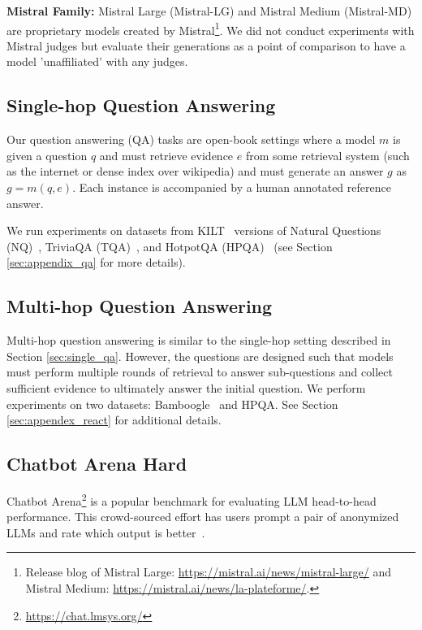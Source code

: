 \documentclass[11pt]{article}
\begin{document}
\noindent\textbf{Mistral Family:}
Mistral Large (Mistral-LG) and Mistral Medium (Mistral-MD) are proprietary models created by Mistral\footnote{Release blog of Mistral Large: \url{https://mistral.ai/news/mistral-large/} and Mistral Medium: \url{https://mistral.ai/news/la-plateforme/}.}. We did not conduct experiments with Mistral judges but evaluate their generations as a point of comparison to have a model 'unaffiliated' with any judges.

\subsection{Single-hop Question Answering \label{sec:single_qa}}
Our question answering (QA) tasks are open-book settings where a model $m$ is given a question $q$ and must retrieve evidence $e$ from some retrieval system (such as the internet or dense index over wikipedia) and must generate an answer $g$ as $g=m(q, e)$. Each instance is accompanied by a human annotated reference answer. 

We run experiments on datasets from KILT~\cite{petroni2021kilt} versions of Natural Questions (NQ)~\cite{kwiatkowski-etal-2019-natural}, TriviaQA (TQA)~\cite{joshi-etal-2017-triviaqa}, and HotpotQA (HPQA)~\cite{yang-etal-2018-hotpotqa} (see Section \ref{sec:appendix_qa} for more details).


\subsection{Multi-hop Question Answering \label{sec:mh_qa}}
Multi-hop question answering is similar to the single-hop setting described in Section \ref{sec:single_qa}. However, the questions are designed such that models must perform multiple rounds of retrieval to answer sub-questions and collect sufficient evidence to ultimately answer the initial question. We perform experiments on two datasets: Bamboogle~\citep{press2023measuring} and HPQA. See Section \ref{sec:appendex_react} for additional details.

\subsection{Chatbot Arena Hard \label{sec:arena_hard}}
Chatbot Arena\footnote{\url{https://chat.lmsys.org/}} is a popular benchmark for evaluating LLM head-to-head performance. This crowd-sourced effort has users prompt a pair of anonymized LLMs and rate which output is better~\cite{zheng2024judging}. 
\end{document}
